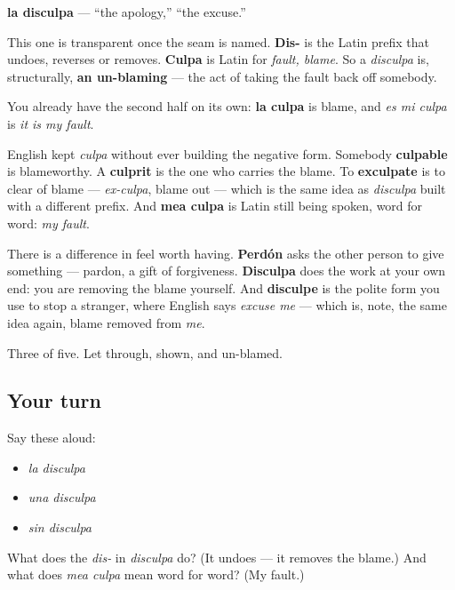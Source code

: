 \begin{cousinweb}
\textbf{la disculpa} — \textquotedblleft{}the apology,\textquotedblright{} \textquotedblleft{}the excuse.\textquotedblright{}

This one is transparent once the seam is named. \textbf{Dis-} is the Latin prefix that undoes, reverses or removes. \textbf{Culpa} is Latin for \emph{fault, blame}. So a \emph{disculpa} is, structurally, \textbf{an un-blaming} — the act of taking the fault back off somebody.

You already have the second half on its own: \textbf{la culpa} is blame, and \emph{es mi culpa} is \emph{it is my fault}.

English kept \emph{culpa} without ever building the negative form. Somebody \textbf{culpable} is blameworthy. A \textbf{culprit} is the one who carries the blame. To \textbf{exculpate} is to clear of blame — \emph{ex-culpa}, blame out — which is the same idea as \emph{disculpa} built with a different prefix. And \textbf{mea culpa} is Latin still being spoken, word for word: \emph{my fault}.

There is a difference in feel worth having. \textbf{Perdón} asks the other person to give something — pardon, a gift of forgiveness. \textbf{Disculpa} does the work at your own end: you are removing the blame yourself. And \textbf{disculpe} is the polite form you use to stop a stranger, where English says \emph{excuse me} — which is, note, the same idea again, blame removed from \emph{me}.
\end{cousinweb}

\begin{grammarlens}[title={What you've built}]
Three of five. Let through, shown, and un-blamed.
\end{grammarlens}

\subsection*{Your turn}
Say these aloud:

\begin{itemize}
\raggedright
  \item \emph{la disculpa}
  \item \emph{una disculpa}
  \item \emph{sin disculpa}
\end{itemize}

\begin{tcolorbox}[breakable,colback=teal!4,colframe=teal!35!black,title={Before you move on}]
What does the \emph{dis-} in \emph{disculpa} do? (It undoes — it removes the blame.) And what does \emph{mea culpa} mean word for word? (My fault.)
\end{tcolorbox}

